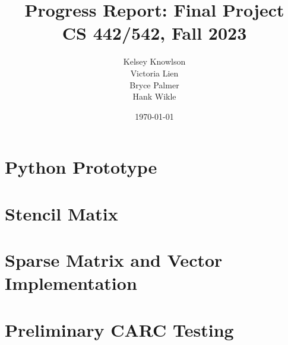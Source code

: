 \documentclass[12pt]{article}
\title{Progress Report: Final Project \\ CS 442/542, Fall 2023}
\author{
        Kelsey Knowlson \\
        Victoria Lien \\ 
        Bryce Palmer \\
        Hank Wikle
}
\date{\today}   %
\begin{document}
\maketitle
\clearpage

\section{Python Prototype}

\section{Stencil Matix}

\section{Sparse Matrix and Vector Implementation}

\section{Preliminary CARC Testing}
\end{document}
